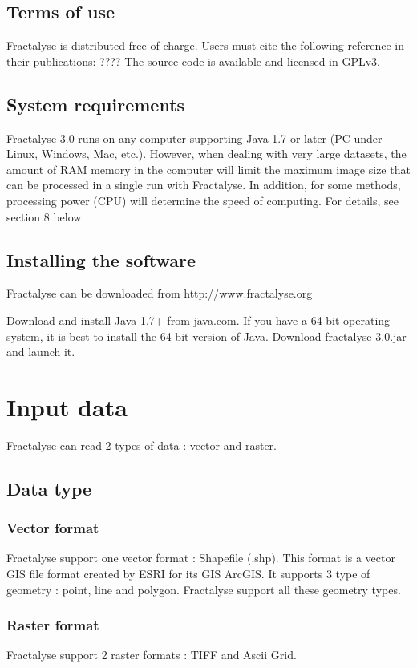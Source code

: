\documentclass[a4paper,10pt]{report}
\begin{document}
\section{Terms of use}
Fractalyse is distributed free-of-charge. Users must cite the following reference in their publications:
????
The source code is available and licensed in GPLv3.
\section{System requirements}
Fractalyse 3.0 runs on any computer supporting Java 1.7 or later (PC under Linux, Windows, Mac, etc.). However,
when dealing with very large datasets, the amount of RAM memory in the computer will limit the maximum image size that can be processed in a single run with Fractalyse. In addition, for some methods, processing power (CPU) will determine the speed of computing. For details, see section 8 below.
\section{Installing the software}
Fractalyse can be downloaded from http://www.fractalyse.org

Download and install Java 1.7+ from java.com. If you have a 64-bit operating system, it is best to install the 64-bit version of Java.
Download fractalyse-3.0.jar and launch it.

\chapter{Input data}
Fractalyse can read 2 types of data : vector and raster.
\section{Data type}
\subsection{Vector format}
Fractalyse support one vector format : Shapefile (.shp). This format is a vector GIS file format created by ESRI for its GIS ArcGIS.
It supports 3 type of geometry : point, line and polygon.
Fractalyse support all these geometry types. 

\subsection{Raster format}
Fractalyse support 2 raster formats : TIFF and Ascii Grid.
\end{document}
